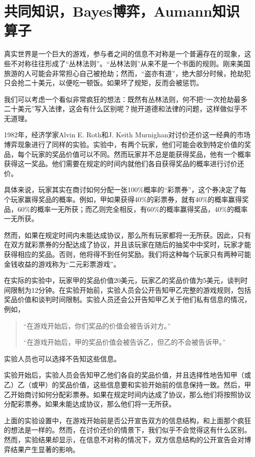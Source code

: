 \chapter{共同知识，Bayes博弈，Aumann知识算子}\label{chap:bayesian-game}

真实世界是一个巨大的游戏，参与者之间的信息不对称是一个普遍存在的现象，这些不对称往往形成了“丛林法则”。“丛林法则”从来不是一个书面的规则。刚来美国旅游的人可能会非常担心自己被抢劫；然而，“盗亦有道”，绝大部分时候，抢劫犯只会抢二十美元，以便吃一顿饭。如果坏了规矩，反而会被惩罚。

我们可以考虑一个看似非常疯狂的想法：既然有丛林法则，何不把“一次抢劫最多二十美元”写入法律，这会有什么区别呢？抛开道德和法律的问题，这样做似乎不无道理。

1982年，经济学家Alvin E. Roth和J. Keith Murnighan对讨价还价这一经典的市场博弈现象进行了同样的实验。实验中，有两个玩家，他们可能会收到特定价值的奖品，每个玩家的奖品价值可以不同。然而玩家并不总是能获得奖品，他有一个概率获得这一奖品。他们需要在规定的时间内就他们各自获得奖品的概率进行讨价还价。

具体来说，玩家其实在商讨如何分配一张100\%概率的“彩票券”，这个券决定了每个玩家赢得奖品的概率。例如，甲如果获得40\%的彩票券，就有40\%的概率赢得奖品，60\%的概率一无所获；而乙则完全相反，有60\%的概率赢得奖品，40\%的概率一无所获。

然而，如果在规定时间内未能达成协议，那么所有玩家都将一无所获。因此，只有在双方就彩票券的分配达成了协议，并且该玩家在随后的抽奖中中奖时，玩家才能获得相应的奖品。否则，他将得不到任何奖励。我们将这种每个玩家只有两种可能金钱收益的游戏称为“二元彩票游戏”。

在实际的实验中，玩家甲的奖品价值20美元，玩家乙的奖品价值为5美元，谈判时间限制为12分钟。在实验开始前，实验人员会公开告知甲乙完整的游戏规则，包括奖品价值和谈判时间限制。实验人员还会公开告知甲乙关于他们私有信息的情况，例如，
\begin{quotation}
    “在游戏开始后，你们奖品的价值会被告诉对方。”

    “在游戏开始后，甲的奖品价值会被告诉乙，但乙的不会被告诉甲。”
\end{quotation}
实验人员也可以选择不告知这些信息。

实验开始后，实验人员会告知甲乙他们各自的奖品价值，并且选择性地告知甲（或乙）乙（或甲）的奖品价值，这些信息要和实验开始前的信息保持一致。然后，甲乙开始商讨如何分配彩票券。如果在规定时间内达成了协议，那么他们将按照协议分配彩票券。如果未能达成协议，那么他们将一无所获。

上面的实验设置中，在游戏开始前是否公开宣告双方的信息结构，和上面那个疯狂的想法是一样的。然而，在讨价还价的情景下，我们似乎不会觉得这有什么区别。然而，实验结果却显示，在信息不对称的情况下，双方信息结构的公开宣告会对博弈结果产生显著的影响。

